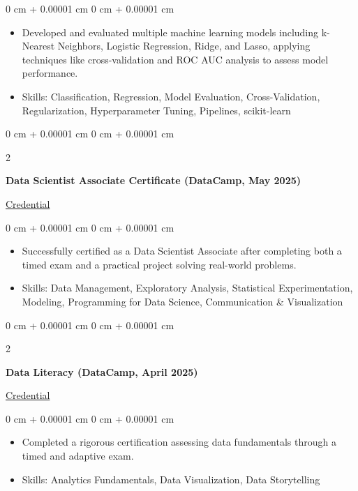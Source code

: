 \documentclass[10pt, letterpaper]{article}
\newenvironment{highlights}{
    \begin{itemize}[
        topsep=0.10 cm,
        parsep=0.10 cm,
        partopsep=0pt,
        itemsep=0pt,
        leftmargin=0 cm + 10pt
    ]
}{
    \end{itemize}
} %
\newenvironment{onecolentry}{
    \begin{adjustwidth}{
        0 cm + 0.00001 cm
    }{
        0 cm + 0.00001 cm
    }
}{
    \end{adjustwidth}
} %
\newenvironment{twocolentry}[2][]{
    \onecolentry
    \def\secondColumn{#2}
    \setcolumnwidth{\fill, 4.5 cm}
    \begin{paracol}{2}
}{
    \switchcolumn \raggedleft \secondColumn
    \end{paracol}
    \endonecolentry
} %
\begin{document}
\begin{onecolentry}
    \begin{highlights}
\item Developed and evaluated multiple machine learning models including k-Nearest Neighbors, Logistic Regression, Ridge, and Lasso, applying techniques like cross-validation and ROC AUC analysis to assess model performance.
\item Skills: Classification, Regression, Model Evaluation, Cross-Validation, Regularization, Hyperparameter Tuning, Pipelines, scikit-learn
    \end{highlights}
\end{onecolentry}
\vspace{0.2 cm}

 \begin{twocolentry}
    {\href{https://www.datacamp.com/certificate/DSA0011426465213}{Credential}}
    \textbf{Data Scientist Associate Certificate (DataCamp, May 2025)}
\end{twocolentry}
\vspace{0.10 cm}

\begin{onecolentry}
    \begin{highlights}
        \item Successfully certified as a Data Scientist Associate after completing both a timed exam and a practical project solving real-world problems.
        \item Skills: Data Management, Exploratory Analysis, Statistical Experimentation, Modeling, Programming for Data Science, Communication \& Visualization
    \end{highlights}
\end{onecolentry}
\vspace{0.2 cm}

\begin{twocolentry}
    {\href{https://www.datacamp.com/skill-verification/DL0033352802672}{Credential}}
    \textbf{Data Literacy (DataCamp, April 2025)}
\end{twocolentry}
\vspace{0.10 cm}


\begin{onecolentry}
    \begin{highlights}
        \item Completed a rigorous certification assessing data fundamentals through a timed and adaptive exam.
        \item Skills: Analytics Fundamentals, Data Visualization, Data Storytelling
    \end{highlights}
\end{onecolentry}
\vspace{0.2 cm}
\end{document}
